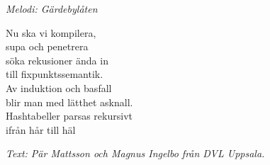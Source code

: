       {\footnotesize\textit{Melodi: Gärdebylåten}}\par
\vspace{10pt}
Nu ska vi kompilera,\\
supa och penetrera\\
söka rekusioner ända in\\
till fixpunktssemantik.\\
Av induktion och basfall\\
blir man med lätthet asknall.\\
Hashtabeller parsas rekursivt\\
ifrån hår till häl\par
\vspace{10pt}
{\footnotesize\textit{Text: Pär Mattsson och Magnus Ingelbo från DVL Uppsala.}}
